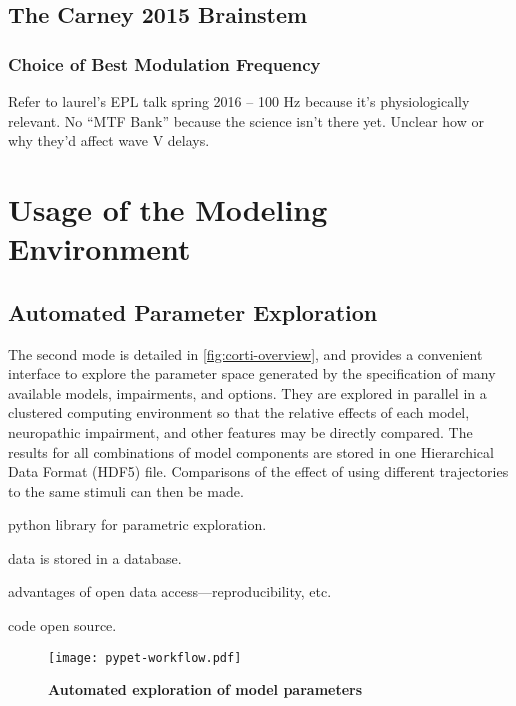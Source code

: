 \subsection{The Carney 2015 Brainstem} %
\label{sub:the_carney_2015_brainstem}

\subsubsection{Choice of Best Modulation Frequency}
Refer to laurel's EPL talk spring 2016 -- 100 Hz because it's physiologically relevant.  No ``MTF Bank'' because the science isn't there yet. Unclear how or why they'd affect wave V delays. 


\section{Usage of the Modeling Environment} %
\label{sec:usage_of_the_modeling_environment}
\subsection{Automated Parameter Exploration} %
\label{sub:automated_parameter_exploration}

The second mode is detailed in \autoref{fig:corti-overview}, and provides a convenient interface to explore the parameter space generated by the specification of many available models, impairments, and options.  They are explored in parallel in a clustered computing environment so that the relative effects of each model, neuropathic impairment, and other features may be directly compared.  The results for all combinations of model components are stored in one Hierarchical Data Format (HDF5) file.  Comparisons of the effect of using different trajectories to the same stimuli can then be made.

python library for parametric exploration. 

data is stored in a database. 

advantages of open data access---reproducibility, etc. 

code open source. 

\begin{figure}[htbp]
	\centering
	\texttt{[image: pypet-workflow.pdf]}
	\caption[Automated exploration of model parameters]{\textbf{Automated exploration of model parameters}}
	\label{fig:pypet-overview}
\end{figure}


